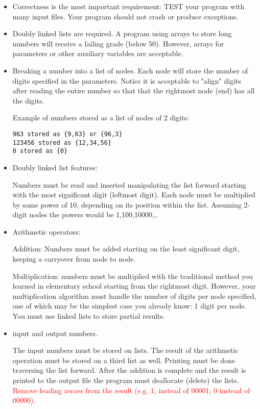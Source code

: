 \documentclass[times,11pt,verbatim,js-singlespace]{article}  %
\begin{document}
\begin{itemize}
\item Correctness is the most important requirement: TEST
 your program with many input files.
 Your program should not crash or produce exceptions.

\item Doubly linked lists are required. A program using
arrays to store long numbers will receive a failing grade (below 50).
However, arrays for parameters or other auxiliary variables are acceptable.

\item Breaking a number into a list of nodes. Each node will store the number of digits specified in
the parameters. Notice it is acceptable to "align" digits after reading the entire number so 
that that the rightmost node (end) has all the digits.

Example of numbers stored as a list of nodes of 2 digits:
\begin{verbatim}
963 stored as {9,63} or {96,3}
123456 stored as {12,34,56}
0 stored as {0}
\end{verbatim}


\item Doubly linked list features:

Numbers must be read and inserted manipulating the list forward
starting with the most significant digit (leftmost digit).
Each node must be multiplied by some power of 10, depending on its
position within the list. Assuming 2-digit nodes the powers
would be 1,100,10000,..

\item Arithmetic operators:

Addition: Numbers must be added  starting on the least significant digit,
keeping a carryover from node to node.

Multiplication: numbers must be multiplied with the traditional method you learned
in elementary school starting from the rightmost digit. 
However, your multiplication
algorithm must handle the number of digits per node specified,
one of which may be the simplest case you already know: 1 digit per node.
You must use linked lists to store partial results.

\item input and output numbers.

The input numbers must be stored on lists.
The result of the arithmetic operation must be stored on a third list as well.
Printing must be done traversing the list forward.
After the addition is complete and the result is printed
to the output file the program must deallocate
(delete) the lists.
\textcolor{red}{Remove leading zeroes from the result (e.g. 1, instead of 00001; 0 instead of 00000)}.


\end{itemize}
\end{document}
